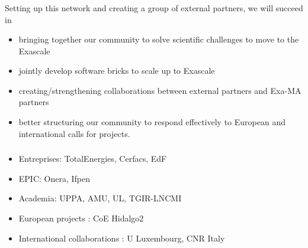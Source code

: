 \begin{frame}
  \frametitle{\insertsectionhead}
  \framesubtitle{\insertsubsectionhead}

  Setting up this network and creating a group of external partners, we will succeed in
  \begin{itemize}
    \item bringing together our community to solve scientific challenges to move to the Exascale
    \item jointly develop software bricks to scale up to Exascale
    \item creating/strengthening collaborations between external partners and Exa-MA partners 
    \item better structuring our community to respond effectively to European and international calls for projects.
  \end{itemize}

\end{frame}
\begin{frame}
  \frametitle{\insertsectionhead}
  \framesubtitle{\insertsubsectionhead}
  \begin{alertblock}{}
    \begin{itemize}
      \item Entreprises: TotalEnergies, Cerfacs, EdF
      \item EPIC: Onera, Ifpen
      \item Academia: UPPA, AMU, UL, TGIR-LNCMI
      \item European projects : CoE Hidalgo2
      \item International collaborations : U Luxembourg, CNR Italy
    \end{itemize}

    \href{https://docs.google.com/spreadsheets/d/1SpvhxFXcr8HfSSdlsU3lIMl73_KH7xFBa65yokAUHdk/edit?usp=sharing}{}
  \end{alertblock}


\end{frame}

